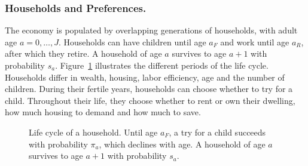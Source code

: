 \subsubsection*{Households and Preferences.}
The economy is populated by overlapping generations of households, with adult
age $a=0,\dots,J$. Households can have children until age $a_F$ and work
until age $a_R$, after which they retire. A household of age $a$ survives to
age $a+1$ with probability $s_a$. Figure~\ref{fig:m-lifecycle} illustrates the
different periods of the life cycle. Households differ in wealth, housing,
labor efficiency, age and the number of children. During their fertile
years, households can choose whether to try for a child. Throughout their
life, they choose whether to rent or own their dwelling, how much housing to
demand and how much to save.
\begin{figure}[ht]
\centering
{}
\caption{Life cycle of a household. Until age $a_F$, a try for a child
succeeds with probability $\pi_a$, which declines with age. A household of age $a$ survives to age
$a+1$ with probability $s_a$.}
\label{fig:m-lifecycle}
\end{figure}

